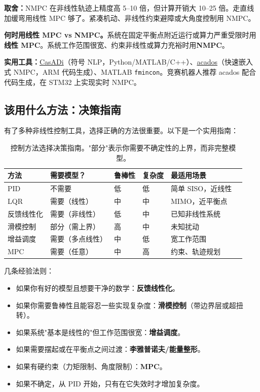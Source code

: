 \begin{mdframed}[linewidth=1pt, innertopmargin=10pt, innerbottommargin=10pt]
\textbf{取舍：}NMPC 在非线性轨迹上精度高 5--10 倍，但计算开销大 10--25 倍。走直线加缓弯用线性 MPC 够了。紧凑机动、非线性约束避障或大角度控制用 NMPC。
\end{mdframed}

\textbf{何时用线性 MPC vs NMPC。}\;系统在固定平衡点附近运行或算力严重受限时用\textbf{线性 MPC}。系统工作范围很宽、约束非线性或算力充裕时用\textbf{NMPC}。

\textbf{实用工具：}\href{https://web.casadi.org/}{CasADi}（符号 NLP，Python/MATLAB/C++）、\href{https://docs.acados.org/}{acados}（快速嵌入式 NMPC，ARM 代码生成）、MATLAB \texttt{fmincon}。竞赛机器人推荐 acados 配合代码生成，在 STM32 上实现实时 NMPC。

\subsection{该用什么方法：决策指南}

有了多种非线性控制工具，选择正确的方法很重要。以下是一个实用指南：

\begin{table}[H]
\centering
\begin{tabular}{@{}llllll@{}}
\toprule
\textbf{方法} & \textbf{需要模型？} & \textbf{鲁棒性} & \textbf{复杂度} & \textbf{最适用场景} \\
\midrule
PID & 不需要 & 低 & 低 & 简单 SISO，近线性 \\
LQR & 需要（线性） & 中 & 中 & MIMO，近平衡点 \\
反馈线性化 & 需要（非线性） & 低 & 中 & 已知非线性系统 \\
滑模控制 & 部分（需上界） & 高 & 中 & 未知扰动 \\
增益调度 & 需要（多点线性） & 中 & 低 & 宽工作范围 \\
MPC & 需要（任意） & 中 & 高 & 约束、轨迹规划 \\
\bottomrule
\end{tabular}
\caption{控制方法选择决策指南。"部分"表示你需要不确定性的上界，而非完整模型。}
\end{table}

几条经验法则：
\begin{itemize}[nosep]
    \item 如果你有好的模型且想要干净的数学：\textbf{反馈线性化}。
    \item 如果你需要鲁棒性且能容忍一些实现复杂度：\textbf{滑模控制}（带边界层或超扭转）。
    \item 如果系统"基本是线性的"但工作范围很宽：\textbf{增益调度}。
    \item 如果需要摆起或在平衡点之间过渡：\textbf{李雅普诺夫/能量整形}。
    \item 如果有硬约束（力矩限制、角度限制）：\textbf{MPC}。
    \item 如果不确定，从 PID 开始，只有在它失效时才增加复杂度。
\end{itemize}

